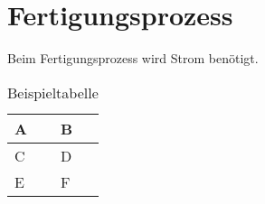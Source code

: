 
\section{Fertigungsprozess}
Beim Fertigungsprozess wird Strom benötigt.

\begin{table}[!h]
    \begin{center}
        \caption{Beispieltabelle}
        \begin{tabularx}{\textwidth}{|X|X|}
            \hline
            A & B \\
            \hline
            C & D \\
            \hline
            E & F \\
            \hline
        \end{tabularx}
    \end{center}
\end{table}